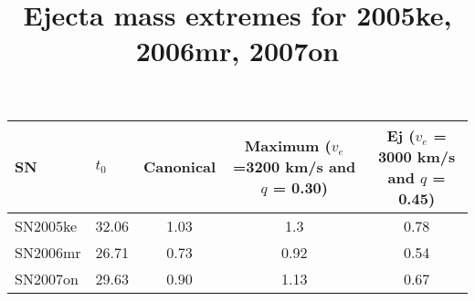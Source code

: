 \documentclass[12pt]{scrartcl}
\date{\vspace{-6ex}}
\begin{document}
\title{\large Ejecta mass extremes for 2005ke, 2006mr, 2007on}
\maketitle

\begin{table*}
\begin{tabular}{llccc}
\hline
SN & $t_0$ & Canonical & Maximum ($v_e$ =3200 km/s and $q$ = 0.30) &  Ej ($v_e$ = 3000 km/s and $q$ = 0.45) \\ 
\hline
SN2005ke & 32.06  & 1.03 & 1.3 &  0.78 \\
SN2006mr & 26.71 &  0.73 & 0.92 & 0.54 \\
SN2007on & 29.63 &  0.90 & 1.13 & 0.67 \\

\end{tabular}
\end{table*}
\end{document}
